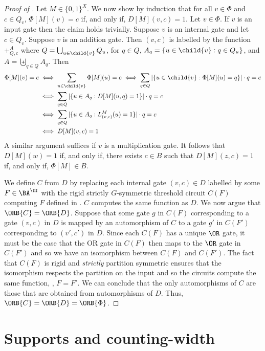 \documentclass{toc}
\begin{document}
\begin{proof}[Proof of ]
  Let $M \in \{0, 1\}^{X}$. We now show by induction that for all $v \in \Phi$
  and $c \in Q_v$, $\Phi[M](v) = c$ if, and only if, $D[M](v, c) = 1$. Let $v
  \in \Phi$. If $v$ is an input gate then the claim holds trivially. Suppose $v$
  is an internal gate and let $c \in Q_v$. Suppose $v$ is an addition gate. Then
  $(v, c)$ is labelled by the function $+^A_{Q, c}$ where $Q = \bigcup_{u \in
    \child{v}} Q_u$, for $q \in Q$, $A_q = \{u \in \child{v} : q \in Q_u\}$, and
  $A = \biguplus_{q \in Q}A_q$. Then
  \begin{align*}
    \Phi[M](v) = c &\iff \sum_{u \in \child{v}} \Phi[M](u) = c 
                     \iff \sum_{q \in Q} \vert \{u \in  \child{v} : \Phi[M](u) = q\}\vert \cdot q = c\\
                   &\iff \sum_{q \in  Q} \vert \{u \in A_q : D[M](u, q) = 1\}\vert \cdot q = c \\
                   &\iff \sum_{q \in Q} \vert \{u \in A_q : L^M_{(v, c)}(u) = 1\} \vert \cdot q = c\\
                   &\iff D[M](v, c) = 1 
  \end{align*}
  A similar argument suffices if $v$ is a multiplication gate. It follows that
  $D[M](w) = 1$ if, and only if, there exists $c \in B$ such that $D[M](z, c) =
  1$ if, and only if, $\Phi[M] \in B$.

  We define $C$ from $D$ by replacing each internal gate $(v, c) \in D$ labelled
  by some $F \in \BA^{\ff}$ with the rigid strictly $G$-symmetric threshold
  circuit $C(F)$ computing $F$ defined in .
  $C$ computes the same function as $D$.  We now argue that $\ORB{C}
  = \ORB{D}$.  Suppose that some gate $g$ in $C(F)$ corresponding to a
  gate $(v,c)$ in $D$ is mapped by an automorphism of $C$ to a gate
  $g'$ in $C(F')$ corresponding to $(v',c')$ in $D$.  Since each
  $C(F)$ has a unique $\OR$ gate, it must be the case that the OR gate in
  $C(F)$ then maps to the $\OR$ gate in $C(F')$ and so we have an
  isomorphism between $C(F)$ and $C(F')$.  The fact that  $C(F)$ is
  rigid and  \emph{strictly} partition
  symmetric ensures that the isomorphism respects the partition on the
  input and so the circuits compute the same function, \ie, $F = F'$.
  We can conclude that the only
  automorphisms of $C$ are those that are obtained from automorphisms
  of $D$.  Thus, $\ORB{C} = \ORB{D} = \ORB{\Phi}$.
\end{proof}


      

\section{Supports and counting-width}\label{sec:supports}
\end{document}
